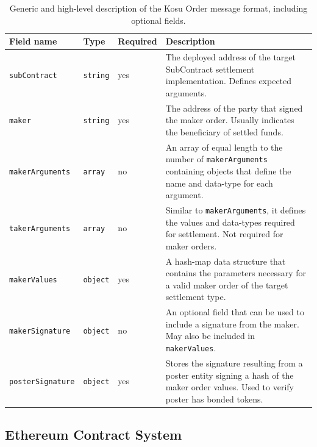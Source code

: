 \documentclass[10pt]{article}
\begin{document}
\bgroup
\def\arraystretch{1.2}
\begin{table}[H]
\centering
\label{table:table2}
\begin{tabularx}{1\textwidth}{|l|l|l|X|}
\hline
\textbf{Field name} & \textbf{Type} & \textbf{Required} & \textbf{Description} \\
\hline
\texttt{subContract} & \texttt{string} & yes & The deployed address of the target SubContract settlement implementation. Defines expected arguments. \\
\hline
\texttt{maker} & \texttt{string} & yes & The address of the party that signed the maker order. Usually indicates the beneficiary of settled funds. \\
\hline
\texttt{makerArguments} & \texttt{array} & no & An array of equal length to the number of \texttt{makerArguments} containing objects that define the name and data-type for each argument. \\
\hline
\texttt{takerArguments} & \texttt{array} & no & Similar to \texttt{makerArguments}, it defines the values and data-types required for settlement. Not required for maker orders. \\
\hline
\texttt{makerValues} & \texttt{object} & yes & A hash-map data structure that contains the parameters necessary for a valid maker order of the target settlement type. \\
\hline
\texttt{makerSignature} & \texttt{object} & no & An optional field that can be used to include a signature from the maker. May also be included in \texttt{makerValues}. \\
\hline
\texttt{posterSignature} & \texttt{object} & yes & Stores the signature resulting from a poster entity signing a hash of the maker order values. Used to verify poster has bonded tokens. \\
\hline
\end{tabularx}
\caption{Generic and high-level description of the Kosu Order message format, including optional fields.} 
\end{table}
\egroup

\subsection{Ethereum Contract System}\label{ethereum-contract-system}
\end{document}
